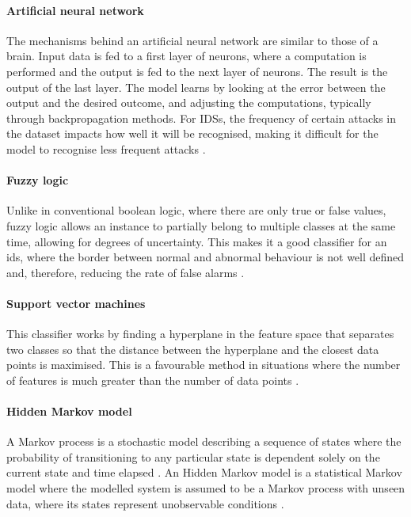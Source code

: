 \paragraph{Artificial neural network}
The mechanisms behind an artificial neural network are similar to those of a brain. Input data is fed to a first layer of neurons, where a computation is performed and the output is fed to the next layer of neurons. The result is the output of the last layer. The model learns by looking at the error between the output and the desired outcome, and adjusting the computations, typically through backpropagation methods. For IDSs, the frequency of certain attacks in the dataset impacts how well it will be recognised, making it difficult for the model to recognise less frequent attacks \citep{Khraisat2019}.

\paragraph{Fuzzy logic}
Unlike in conventional boolean logic, where there are only true or false values, fuzzy logic allows an instance to partially belong to multiple classes at the same time, allowing for degrees of uncertainty. This makes it a good classifier for an \gls{ids}, where the border between normal and abnormal behaviour is not well defined and, therefore, reducing the rate of false alarms \citep{Khraisat2019}.

\paragraph{Support vector machines}
This classifier works by finding a hyperplane in the feature space that separates two classes so that the distance between the hyperplane and the closest data points is maximised. This is a favourable method in situations where the number of features is much greater than the number of data points \citep{Buczak2016}.

\paragraph{Hidden Markov model}
A Markov process is a stochastic model describing a sequence of states where the probability of transitioning to any particular state is dependent solely on the current state and time elapsed \citep{Maltby}. An Hidden Markov model is a statistical Markov model where the modelled system is assumed to be a Markov process with unseen data, where its states represent unobservable conditions \citep{Buczak2016}.


